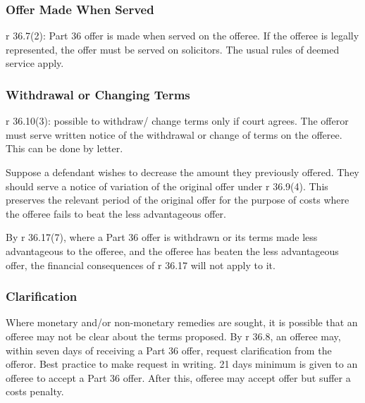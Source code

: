 \documentclass[
]{article}
\newenvironment{Shaded}{}{}
\newcommand{\NormalTok}[1]{#1}
\begin{document}
\hypertarget{offer-made-when-served}{%
\subsubsection{Offer Made When Served}\label{offer-made-when-served}}

r 36.7(2): Part 36 offer is made when served on the offeree. If the
offeree is legally represented, the offer must be served on solicitors.
The usual rules of deemed service apply.

\hypertarget{withdrawal-or-changing-terms}{%
\subsubsection{Withdrawal or Changing
Terms}\label{withdrawal-or-changing-terms}}

r 36.10(3): possible to withdraw/ change terms only if court agrees. The
offeror must serve written notice of the withdrawal or change of terms
on the offeree. This can be done by letter.

Suppose a defendant wishes to decrease the amount they previously
offered. They should serve a notice of variation of the original offer
under r 36.9(4). This preserves the relevant period of the original
offer for the purpose of costs where the offeree fails to beat the less
advantageous offer.

\begin{Shaded}
\begin{Highlighting}[]
\NormalTok{By r 36.17(7), where a Part 36 offer is withdrawn or its terms made less advantageous to the offeree, and the offeree has beaten the less advantageous offer, the financial consequences of r 36.17 will not apply to it.}
\end{Highlighting}
\end{Shaded}

\hypertarget{clarification}{%
\subsubsection{Clarification}\label{clarification}}

Where monetary and/or non-monetary remedies are sought, it is possible
that an offeree may not be clear about the terms proposed. By r 36.8, an
offeree may, within seven days of receiving a Part 36 offer, request
clarification from the offeror. Best practice to make request in
writing. 21 days minimum is given to an offeree to accept a Part 36
offer. After this, offeree may accept offer but suffer a costs penalty.
\end{document}
